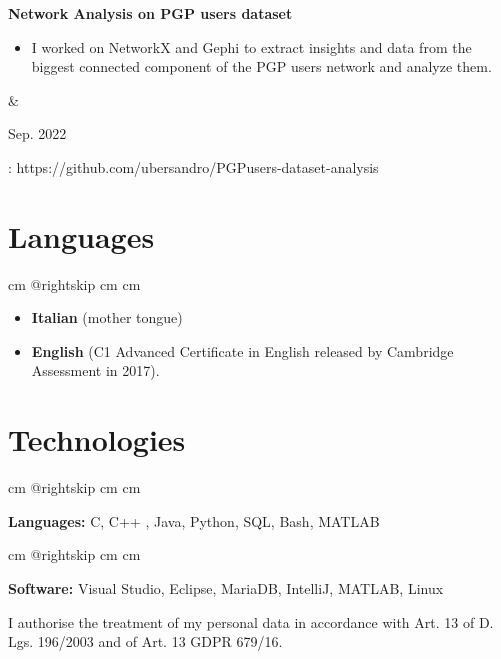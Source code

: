 \documentclass[10pt, letterpaper]{article}
\newenvironment{highlights}{
        \begin{itemize}[
                topsep=0pt,
                parsep=0.10 cm,
                partopsep=0pt,
                itemsep=0pt,
                after=\vspace{-1\baselineskip},
                leftmargin=0.4 cm + 3pt
            ]
    }{
        \end{itemize}
    } %
\let\hrefWithoutArrow\href
\renewcommand{\href}[2]{\hrefWithoutArrow{#1}{\mbox{\ifthenelse{\equal{#2}{}}{ }{#2 }\raisebox{.15ex}{\footnotesize \faExternalLink*}}}}
\let\originalTabularx\tabularx
\let\originalEndTabularx\endtabularx
\renewenvironment{tabularx}{\bgroup\centering\originalTabularx}{\originalEndTabularx\par\egroup}
\begin{document}
        \begin{tabularx}{
            \textwidth-0.4 cm-0.13cm
        }{
            K{0.2 cm}
            R{4.1 cm}
        }
            \textbf{Network Analysis on PGP users dataset}

            \vspace{0.10 cm}

            \begin{highlights}
                \item I worked on NetworkX and Gephi to extract insights and data from the biggest connected component of the PGP users network and analyze them. 
            \end{highlights}
            &
        
            Sep. 2022
        \end{tabularx}
        \href{https://github.com/ubersandro/PGPusers-dataset-analysis}{Link}: https://github.com/ubersandro/PGPusers-dataset-analysis

        \vspace{0.2 cm}

    


    \section{Languages} 
    \begingroup{} cm
        \advance\csname @rightskip cm
        \advance{} cm
\begin{highlights}
    \item \textbf{Italian} (mother tongue)
    \item \textbf{English} (C1 Advanced Certificate in English released by Cambridge Assessment in 2017).
\end{highlights}

\vspace{0.3cm}

    \section{Technologies}

        \begingroup{} cm
        \advance\csname @rightskip cm
        \advance{} cm

        \textbf{Languages:} C, C++ , Java, Python, SQL, Bash, MATLAB  \par\endgroup

        \vspace{0.2 cm}
        \begingroup{} cm
        \advance\csname @rightskip cm
        \advance{} cm

        \textbf{Software:} Visual Studio, Eclipse, MariaDB, IntelliJ, MATLAB, Linux \par\endgroup

I authorise the treatment of my personal data in accordance with Art. 13 of D. Lgs. 196/2003 and of Art. 13 GDPR 679/16. 
\end{document}

